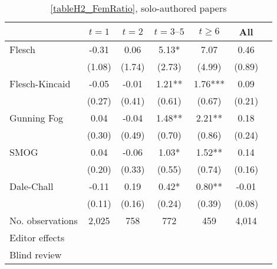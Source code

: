 \begin{table}
    \footnotesize
    \centering
    \begin{threeparttable}
        \caption{\autoref{tableH2_FemRatio}, solo-authored papers}
        \label{tableH2_FemSolo}
        \begin{tabular}{p{3cm}S@{}S@{}S@{}S@{}S@{}S@{}}
            \toprule
            &{\(t=1\)}&{\(t=2\)}&{\(t=3\text{--}5\)}&{\(t\ge6\)}&{All}\\
            \midrule
            Flesch                        &       -0.31   &        0.06   &        5.13*  &        7.07   &        0.46   \\
                                          &      (1.08)   &      (1.74)   &      (2.73)   &      (4.99)   &      (0.89)   \\
            Flesch-Kincaid                &       -0.05   &       -0.01   &        1.21** &        1.76***&        0.09   \\
                                          &      (0.27)   &      (0.41)   &      (0.61)   &      (0.67)   &      (0.21)   \\
            Gunning Fog                   &        0.04   &       -0.04   &        1.48** &        2.21** &        0.18   \\
                                          &      (0.30)   &      (0.49)   &      (0.70)   &      (0.86)   &      (0.24)   \\
            SMOG                          &        0.04   &       -0.06   &        1.03*  &        1.52** &        0.14   \\
                                          &      (0.20)   &      (0.33)   &      (0.55)   &      (0.74)   &      (0.16)   \\
            Dale-Chall                    &       -0.11   &        0.19   &        0.42*  &        0.80** &       -0.01   \\
                                          &      (0.11)   &      (0.16)   &      (0.24)   &      (0.39)   &      (0.08)   \\
            \midrule
            No. observations              &       2,025   &         758   &         772   &         459   &       4,014   \\
            \midrule
            Editor effects       &           {}   &           {}   &           {}   &           {}   &           {}   \\
            Blind review                  &           {}   &           {}   &           {}   &           {}   &               \\

\end{tabular}
\end{threeparttable}
\end{table}
